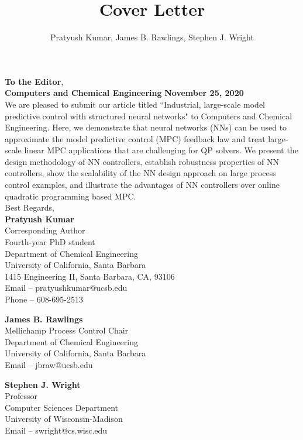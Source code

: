 \documentclass[xcolor=dvipsnames, 11pt]{article}
\title{Cover Letter}
\author{Pratyush Kumar, James B. Rawlings, Stephen J. Wright}
\begin{document}
\vspace{0.1in}
\noindent \textbf{To the Editor}, \\
\textbf{Computers and Chemical Engineering} \hfill \textbf{November 25, 2020} \\

\noindent We are pleased to submit our article titled ``Industrial, large-scale
model predictive control with structured neural networks" to Computers and
Chemical Engineering. Here, we demonstrate that neural networks (NNs) can be
used to approximate the model predictive control (MPC) feedback law and treat
large-scale linear MPC applications that are challenging for QP solvers. We
present the design methodology of NN controllers, establish robustness
properties of NN controllers, show the scalability of the NN design approach on
large process control examples, and illustrate the advantages 
of NN controllers over online quadratic
programming based MPC.  \\

\medskip
\noindent Best Regards, \\

\noindent \textbf{Pratyush Kumar} \\ 
Corresponding Author \\
Fourth-year PhD student \\
Department of Chemical Engineering \\
University of California, Santa Barbara \\ 
1415 Engineering II, Santa Barbara, CA, 93106 \\
Email -- pratyushkumar@ucsb.edu\\
Phone -- 608-695-2513 \\

\medskip

\noindent \textbf{James B. Rawlings} \\ 
Mellichamp Process Control Chair \\
Department of Chemical Engineering \\
University of California, Santa Barbara \\ 
Email -- jbraw@ucsb.edu \\

\medskip

\noindent \textbf{Stephen J. Wright} \\ 
Professor \\
Computer Sciences Department \\
University of Wisconsin-Madison \\ 
Email -- swright@cs.wisc.edu\\
\end{document}
